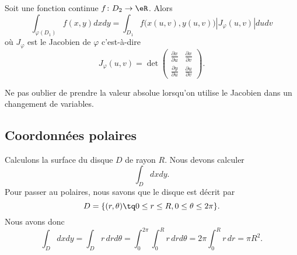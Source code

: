 \begin{theorem}     \label{ThoChamDeVarIntDDf}
	Soit une fonction continue $f\colon D_2\to \eR$. Alors
	\begin{equation}
		\int_{\varphi(D_1)}f(x,y)dxdy=\int_{D_1}f\big( x(u,v),y(u,v) \big)| J_{\varphi}(u,v) |dudv
	\end{equation}
	où $J_{\varphi}$ est le Jacobien de $\varphi$ c'est-à-dire
	\begin{equation}
		J_{\varphi}(u,v)=\det\begin{pmatrix}
			\frac{ \partial x }{ \partial u } & \frac{ \partial x }{ \partial v } \\
			\frac{ \partial y }{ \partial u } & \frac{ \partial u }{ \partial v }
		\end{pmatrix}.
	\end{equation}
\end{theorem}
Ne pas oublier de prendre la valeur absolue lorsqu'on utilise le Jacobien dans un changement de variables.

\subsection{Coordonnées polaires}

\begin{example}
	Calculons la surface du disque $D$ de rayon $R$. Nous devons calculer
	\begin{equation}
		\int_Ddxdy.
	\end{equation}
	Pour passer au polaires, nous savons que le disque est décrit par
	\begin{equation}
		D=\{ (r,\theta)\tq 0\leq r\leq R,0\leq\theta\leq 2\pi \}.
	\end{equation}
	Nous avons donc
	\begin{equation}
		\int_Ddxdy=\int_{D}r\,drd\theta=\int_0^{2\pi}\int_0^Rr\,drd\theta=2\pi\int_0^Rr\,dr=\pi R^2.
	\end{equation}
\end{example}

